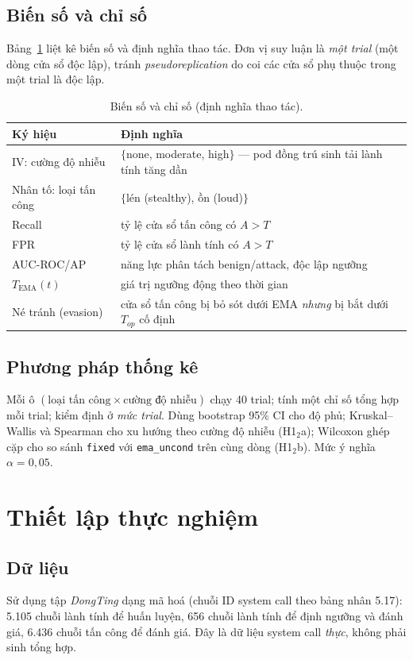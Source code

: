 \documentclass[conference,10pt]{IEEEtran}
\begin{document}
\subsection{Biến số và chỉ số}
Bảng~\ref{tab:metrics} liệt kê biến số và định nghĩa thao tác. Đơn vị suy luận là \textit{một trial} (một dòng cửa sổ độc lập), tránh \textit{pseudoreplication} do coi các cửa sổ phụ thuộc trong một trial là độc lập.

\begin{table}[t]
\caption{Biến số và chỉ số (định nghĩa thao tác).}
\label{tab:metrics}
\centering
\renewcommand{\arraystretch}{1.12}
\begin{tabular}{@{}p{2.0cm}p{5.6cm}@{}}
\toprule
\textbf{Ký hiệu} & \textbf{Định nghĩa} \\
\midrule
IV: cường độ nhiễu & $\{$none, moderate, high$\}$ — pod đồng trú sinh tải lành tính tăng dần \\
Nhân tố: loại tấn công & $\{$lén (stealthy), ồn (loud)$\}$ \\
Recall & tỷ lệ cửa sổ tấn công có $A>T$ \\
FPR & tỷ lệ cửa sổ lành tính có $A>T$ \\
AUC-ROC/AP & năng lực phân tách benign/attack, độc lập ngưỡng \\
$T_{\text{EMA}}(t)$ & giá trị ngưỡng động theo thời gian \\
Né tránh (evasion) & cửa sổ tấn công bị bỏ sót dưới EMA \textit{nhưng} bị bắt dưới $T_{op}$ cố định \\
\bottomrule
\end{tabular}
\end{table}

\subsection{Phương pháp thống kê}
Mỗi ô $(\text{loại tấn công}\times\text{cường độ nhiễu})$ chạy 40 trial; tính một chỉ số tổng hợp mỗi trial; kiểm định ở \textit{mức trial}. Dùng bootstrap 95\% CI cho độ phủ; Kruskal--Wallis và Spearman cho xu hướng theo cường độ nhiễu (H1$_2$a); Wilcoxon ghép cặp cho so sánh \texttt{fixed} với \texttt{ema\_uncond} trên cùng dòng (H1$_2$b). Mức ý nghĩa $\alpha=0{,}05$.

\section{Thiết lập thực nghiệm}

\subsection{Dữ liệu}
Sử dụng tập \textit{DongTing} \cite{dongting2023} dạng mã hoá (chuỗi ID system call theo bảng nhân 5.17): 5.105 chuỗi lành tính để huấn luyện, 656 chuỗi lành tính để định ngưỡng và đánh giá, 6.436 chuỗi tấn công để đánh giá. Đây là dữ liệu system call \textit{thực}, không phải sinh tổng hợp.
\end{document}
